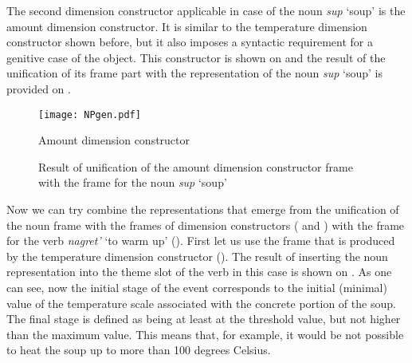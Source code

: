 The second dimension constructor applicable in case of the noun \textit{sup} `soup' is the amount dimension constructor. It is similar to the temperature dimension constructor shown before, but it also imposes a syntactic requirement for a genitive case of the object. This constructor is shown on  and the result of the unification of its frame part with the representation of the noun \textit{sup} `soup' is provided on .

\begin{figure}
\begin{minipage}{0.5\textwidth}
\end{minipage}
\begin{minipage}{0.35\textwidth}
\texttt{[image: NPgen.pdf]}
\end{minipage}
\caption{Amount dimension constructor \label{constructor:amount}}
\end{figure}

\begin{figure}
\centering
{}
\caption{Result of unification of the amount dimension constructor frame with the frame for the noun \textit{sup} `soup' \label{frame:soup:amount}}
\end{figure}

Now we can try combine the representations that emerge from the unification of the noun frame with the  frames of dimension constructors ( and ) with the frame for the verb \textit{nagret'} `to warm up' (). First let us use the frame that is produced by the temperature dimension constructor (). The result of inserting the noun representation into the theme slot of the verb in this case is shown on . As one can see, now the initial stage of the event corresponds to the initial (minimal) value of the temperature scale associated with the concrete portion of the soup. The final stage is defined as being at least at the threshold value, but not higher than the maximum value. This means that, for example, it would be not possible to heat the soup up to more than 100 degrees Celsius. 

